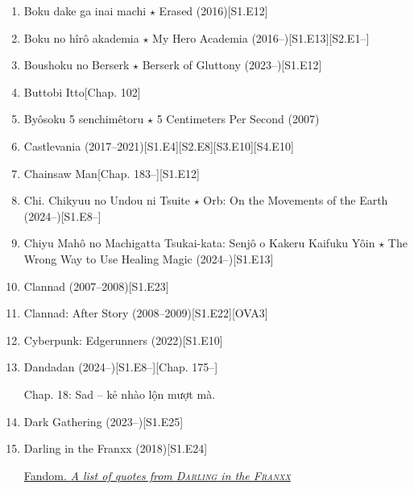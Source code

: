 \documentclass{article}
\begin{document}
\begin{enumerate}
\begin{itemize}
    \end{itemize}
    \item {\sc Boku dake ga inai machi $\star$ Erased} (2016)\hfill[S1.E12]
    \item Boku no hîrô akademia $\star$ My Hero Academia (2016--)\hfill[S1.E13][S2.E1--]
    \item {\sc Boushoku no Berserk $\star$ Berserk of Gluttony} (2023--)\hfill[S1.E12]
    \item {\sc Buttobi Itto}\hfill[Chap. 102]
    \item {\sc By\^osoku 5 senchimêtoru $\star$ 5 Centimeters Per Second} (2007)
    \item {\sc Castlevania} (2017--2021)\hfill[S1.E4][S2.E8][S3.E10][S4.E10]
    \item {\sc Chainsaw Man}\hfill[Chap. 183--][S1.E12]
    \item Chi. Chikyuu no Undou ni Tsuite $\star$ Orb: On the Movements of the Earth (2024--)\hfill[S1.E8--]
    \item {\sc Chiyu Mahô no Machigatta Tsukai-kata: Senjô o Kakeru Kaifuku Yôin $\star$ The Wrong Way to Use Healing Magic} (2024--)[S1.E13]
    \item {\sc Clannad} (2007--2008)\hfill[S1.E23]
    \item {\sc Clannad: After Story} (2008--2009)\hfill[S1.E22][OVA3]
    \item {\sc Cyberpunk: Edgerunners} (2022)\hfill[S1.E10]
    \item Dandadan (2024--)\hfill[S1.E8--][Chap. 175--]
    
    Chap. 18: Sad -- kẻ nhào lộn mượt mà.
    \item {\sc Dark Gathering} (2023--)\hfill[S1.E25]
    \item {\sc Darling in the Franxx} (2018)\hfill[S1.E24]
    
    \href{https://darling-in-the-franxx.fandom.com/wiki/List_of_Quotes}{Fandom. {\it A list of quotes from \textsc{Darling} in the \textsc{Franxx}}}
    

\end{enumerate}
\end{document}
